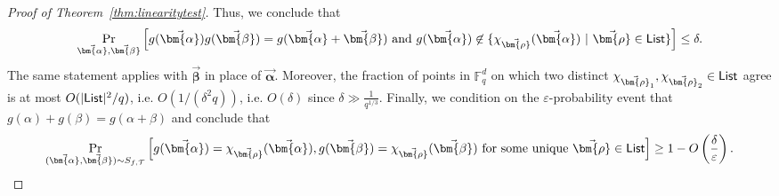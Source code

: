 \documentclass[11pt]{article}
\newcommand{\F}{\mathbb{F}}
\renewcommand{\epsilon}{\varepsilon}
\newcommand{\alphab}{\vec{\bm{\alpha}}}
\newcommand{\betab}{\vec{\bm{\beta}}}
\newcommand{\rhob}{\vec{\bm{\rho}}}
\begin{document}
\begin{proof}[Proof of Theorem~\ref{thm:linearitytest}]
Thus, we conclude that  
$$\Pr_{\alphab,\betab } \left[ g(\alphab) g(\betab)= g(\alphab+\betab) \ \mbox{and} \ g(\alphab) \not\in \{ \chi_{\rhob}(\alphab) ~| ~
\rhob \in {\sf List} \}
\right] \leq \delta.$$
The same statement applies with $\betab$ in place of $\alphab$. Moreover, the fraction of points in $\F_q^d$ on which two distinct 
$\chi_{\rhob_1}, \chi_{\rhob_2} \in {\sf List}$ agree is at most $O(|{\sf List}|^2/q)$, i.e. $O(1/(\delta^2q))$, i.e.
$O(\delta)$ since $\delta \gg \frac{1}{q^{1/3}}$. Finally, 
we condition on the $\epsilon$-probability event that $g(\alpha)+g(\beta)=g(\alpha+\beta)$ and 
conclude that 
$$\Pr_{(\alphab,\betab) \sim S_{f, {\mathcal T} }}  
\left[  g(\alphab) = \chi_{\rhob}(\alphab), 
g(\betab) = \chi_{\rhob}(\betab) \ \mbox{for some unique} \ \rhob \in {\sf List}  
\right] \geq 1- O\left(\frac{\delta}{\epsilon}\right).$$
\end{proof}
\end{document}
